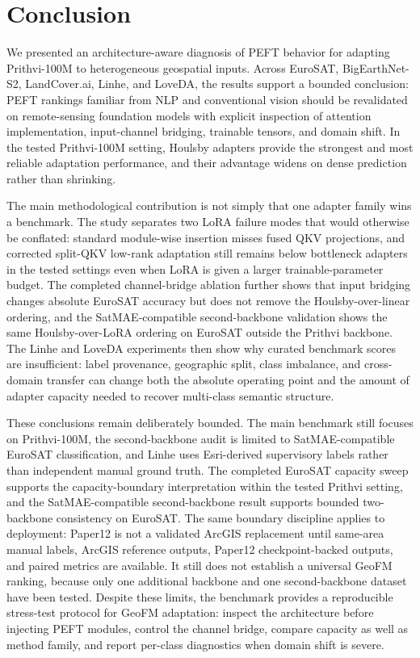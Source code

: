 \section{Conclusion}

We presented an architecture-aware diagnosis of PEFT behavior for adapting Prithvi-100M to heterogeneous geospatial inputs. Across EuroSAT, BigEarthNet-S2, LandCover.ai, Linhe, and LoveDA, the results support a bounded conclusion: PEFT rankings familiar from NLP and conventional vision should be revalidated on remote-sensing foundation models with explicit inspection of attention implementation, input-channel bridging, trainable tensors, and domain shift. In the tested Prithvi-100M setting, Houlsby adapters provide the strongest and most reliable adaptation performance, and their advantage widens on dense prediction rather than shrinking.

The main methodological contribution is not simply that one adapter family wins a benchmark. The study separates two LoRA failure modes that would otherwise be conflated: standard module-wise insertion misses fused QKV projections, and corrected split-QKV low-rank adaptation still remains below bottleneck adapters in the tested settings even when LoRA is given a larger trainable-parameter budget. The completed channel-bridge ablation further shows that input bridging changes absolute EuroSAT accuracy but does not remove the Houlsby-over-linear ordering, and the SatMAE-compatible second-backbone validation shows the same Houlsby-over-LoRA ordering on EuroSAT outside the Prithvi backbone. The Linhe and LoveDA experiments then show why curated benchmark scores are insufficient: label provenance, geographic split, class imbalance, and cross-domain transfer can change both the absolute operating point and the amount of adapter capacity needed to recover multi-class semantic structure.

These conclusions remain deliberately bounded. The main benchmark still focuses on Prithvi-100M, the second-backbone audit is limited to SatMAE-compatible EuroSAT classification, and Linhe uses Esri-derived supervisory labels rather than independent manual ground truth. The completed EuroSAT capacity sweep supports the capacity-boundary interpretation within the tested Prithvi setting, and the SatMAE-compatible second-backbone result supports bounded two-backbone consistency on EuroSAT. The same boundary discipline applies to deployment: Paper12 is not a validated ArcGIS replacement until same-area manual labels, ArcGIS reference outputs, Paper12 checkpoint-backed outputs, and paired metrics are available. It still does not establish a universal GeoFM ranking, because only one additional backbone and one second-backbone dataset have been tested. Despite these limits, the benchmark provides a reproducible stress-test protocol for GeoFM adaptation: inspect the architecture before injecting PEFT modules, control the channel bridge, compare capacity as well as method family, and report per-class diagnostics when domain shift is severe.
